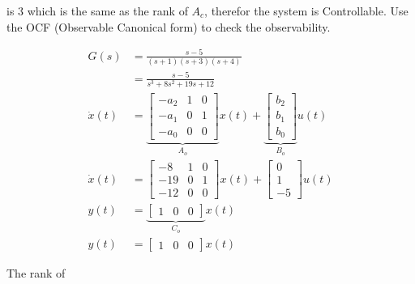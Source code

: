 \documentclass[main.tex]{subfiles}
\begin{document}
\begin{enumerate}
\begin{enumerate}
    is 3 which is the same as the rank of $A_c$, therefor the system is Controllable. Use the OCF (Observable Canonical form) to check the observability.
    
    $$
    \begin{aligned}
    G(s) &= \frac{s-5}{(s+1)(s+3)(s+4)}\\
    &= \frac{s-5}{s^3+8 s^2+19 s+12}\\
    \dot{x}(t) &= \underbrace{\left[\begin{array}{lll}
    -a_2 & 1 & 0 \\
    -a_1 & 0 & 1 \\
    -a_0 & 0 & 0
    \end{array}\right]}_{A_o} x(t)+\underbrace{\left[\begin{array}{l}
    b_2 \\
    b_1 \\
    b_0
    \end{array}\right]}_{B_o} u(t) \\
    \dot{x}(t) &= \left[\begin{array}{lll}
    -8 & 1 & 0 \\
    -19 & 0 & 1 \\
    -12 & 0 & 0
    \end{array}\right] x(t) + \left[\begin{array}{l}
    0 \\
    1 \\
    -5
    \end{array}\right] u(t) \\
    y(t) &= \underbrace{\left[\begin{array}{lll}
    1 & 0 & 0
    \end{array}\right]}_{C_o} x(t) \\
    y(t) &= \left[\begin{array}{lll}
    1 & 0 & 0
    \end{array}\right] x(t)
    \end{aligned}
    $$
    
    The rank of
    

\end{enumerate}
\end{enumerate}
\end{document}
